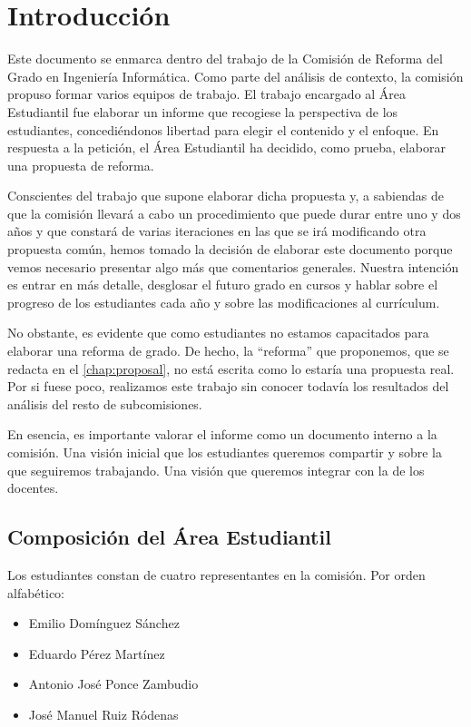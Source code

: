 \chapter{Introducción}

Este documento se enmarca dentro del trabajo de
la Comisión de Reforma del Grado en Ingeniería Informática.
Como parte del análisis de contexto,
la comisión propuso formar varios equipos de trabajo.
El trabajo encargado al Área Estudiantil fue elaborar un informe
que recogiese la perspectiva de los estudiantes,
concediéndonos libertad para elegir el contenido y el enfoque.
En respuesta a la petición,
el Área Estudiantil ha decidido, como prueba, elaborar una propuesta de reforma.

Conscientes del trabajo que supone elaborar dicha propuesta
y, a sabiendas de que la comisión llevará a cabo un procedimiento
que puede durar entre uno y dos años
y que constará de varias iteraciones en las que
se irá modificando otra propuesta común,
hemos tomado la decisión de elaborar este documento porque
vemos necesario presentar algo más que comentarios generales.
Nuestra intención es entrar en más detalle,
desglosar el futuro grado en cursos y
hablar sobre el progreso de los estudiantes cada año y
sobre las modificaciones al currículum.

No obstante, es evidente que como estudiantes
no estamos capacitados para elaborar una reforma de grado.
De hecho, la ``reforma'' que proponemos,
que se redacta en el \cref{chap:proposal},
no está escrita como lo estaría una propuesta real.
Por si fuese poco, realizamos este trabajo sin conocer todavía
los resultados del análisis del resto de subcomisiones.

En esencia, es importante valorar el informe como
un documento interno a la comisión.
Una visión inicial que los estudiantes queremos compartir
y sobre la que seguiremos trabajando.
Una visión que queremos integrar con la de los docentes.

\section{Composición del Área Estudiantil}

Los estudiantes constan de cuatro representantes en la comisión.
Por orden alfabético:
\begin{itemize}
    \item Emilio Domínguez Sánchez
    \item Eduardo Pérez Martínez
    \item Antonio José Ponce Zambudio
    \item José Manuel Ruiz Ródenas
\end{itemize}

